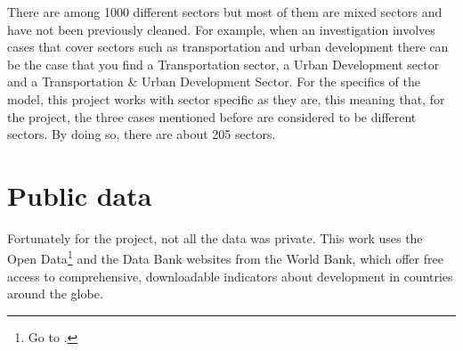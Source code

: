 There are among 1000 different sectors but most of them are mixed sectors and have not been previously cleaned. For example, when an investigation involves cases that cover sectors such as transportation and urban development there can be the case that you find a Transportation sector, a Urban Development sector and a Transportation \& Urban Development Sector. For the specifics of the model, this project works with sector specific as they are, this meaning that, for the project, the three cases mentioned before are considered to be different sectors. By doing so, there are about 205 sectors.






\section{Public data}\label{sec_public_data}


Fortunately for the project, not all the data was private. This work uses the Open Data\footnote{Go to \cite{wb_data}.}  and the Data Bank websites from the World Bank, which offer free access to comprehensive, downloadable indicators about development in countries around the globe. 

